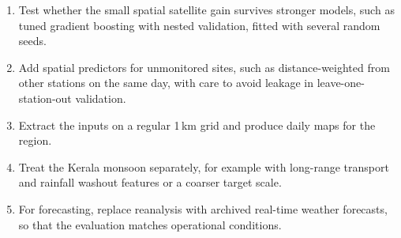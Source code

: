 \begin{enumerate}
  \item Test whether the small spatial satellite gain survives stronger models, such as tuned
        gradient boosting with nested validation, fitted with several random seeds.
  \item Add spatial predictors for unmonitored sites, such as distance-weighted \pmtf{} from other
        stations on the same day, with care to avoid leakage in leave-one-station-out validation.
  \item Extract the inputs on a regular 1\,km grid and produce daily \pmtf{} maps for the region.
  \item Treat the Kerala monsoon separately, for example with long-range transport and rainfall
        washout features or a coarser target scale.
  \item For forecasting, replace reanalysis with archived real-time weather forecasts, so that the
        evaluation matches operational conditions.
\end{enumerate}
